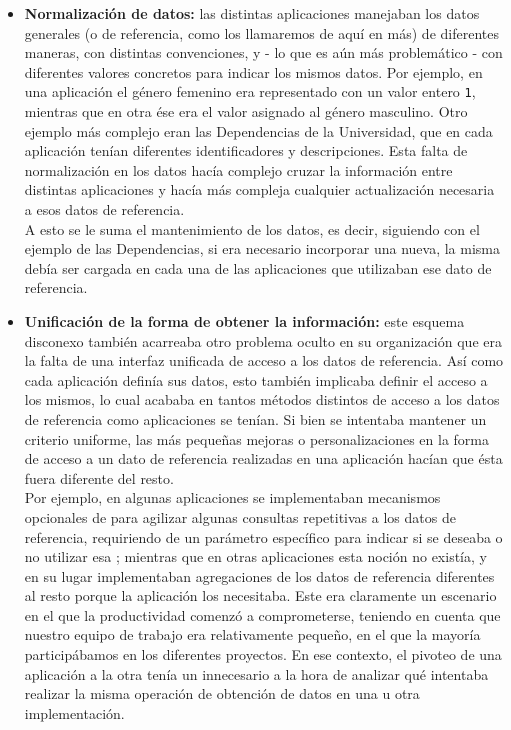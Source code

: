 \begin{itemize}
  \item \textbf{Normalización de datos:} las distintas aplicaciones manejaban los datos generales (o de referencia, como los llamaremos de aquí en más) de diferentes maneras, con distintas convenciones, y - lo que es aún más problemático - con diferentes valores concretos para indicar los mismos datos. Por ejemplo, en una aplicación el género femenino era representado con un valor entero \texttt{1}, mientras que en otra ése era el valor asignado al género masculino. Otro ejemplo más complejo eran las Dependencias de la Universidad, que en cada aplicación tenían diferentes identificadores y descripciones. Esta falta de normalización en los datos hacía complejo cruzar la información entre distintas aplicaciones y hacía más compleja cualquier actualización necesaria a esos datos de referencia.\\
  A esto se le suma el mantenimiento de los datos, es decir, siguiendo con el ejemplo de las Dependencias, si era necesario incorporar una nueva, la misma debía ser cargada en cada una de las aplicaciones que utilizaban ese dato de referencia.

  \item \textbf{Unificación de la forma de obtener la información:} este esquema disconexo también acarreaba otro problema oculto en su organización que era la falta de una interfaz unificada de acceso a los datos de referencia. Así como cada aplicación definía sus datos, esto también implicaba definir el acceso a los mismos, lo cual acababa en tantos métodos distintos de acceso a los datos de referencia como aplicaciones se tenían. Si bien se intentaba mantener un criterio uniforme, las más pequeñas mejoras o personalizaciones en la forma de acceso a un dato de referencia realizadas en una aplicación hacían que ésta fuera diferente del resto.\\
  Por ejemplo, en algunas aplicaciones se implementaban mecanismos opcionales de  para agilizar algunas consultas repetitivas a los datos de referencia, requiriendo de un parámetro específico para indicar si se deseaba o no utilizar esa ; mientras que en otras aplicaciones esta noción no existía, y en su lugar implementaban agregaciones de los datos de referencia diferentes al resto porque la aplicación los necesitaba. Este era claramente un escenario en el que la productividad comenzó a comprometerse, teniendo en cuenta que nuestro equipo de trabajo era relativamente pequeño, en el que la mayoría participábamos en los diferentes proyectos.  En ese contexto, el pivoteo de una aplicación a la otra tenía un  innecesario a la hora de analizar qué intentaba realizar la misma operación de obtención de datos en una u otra implementación.


\end{itemize}
